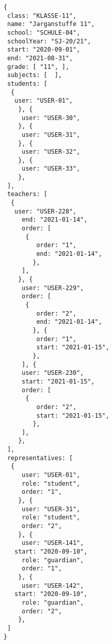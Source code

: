 
\begin{lstlisting}[caption={Klassen-Datenmodell Beispiel 2: Jahrgangstufe 11, Sekundarstufe 2},frame=tlrb]
{
 class: "KLASSE-11",
 name: "Jarganstuffe 11",
 school: "SCHULE-04",
 schoolYear: "SJ-20/21",
 start: "2020-09-01",
 end: "2021-08-31",
 grade: [ "11", ],
 subjects: [  ],
 students: [
  { 
   user: "USER-01",
	}, { 
	 user: "USER-30",
	}, { 
	 user: "USER-31",
	}, { 
	 user: "USER-32",
	}, { 
	 user: "USER-33",
	},
 ],
 teachers: [
  { 
   user: "USER-228",
	 end: "2021-01-14",
	 order: [
	  {
		 order: "1",
		 end: "2021-01-14",
		},
	 ],
	}, { 
	 user: "USER-229",
	 order: [
	  {
		 order: "2",
		 end: "2021-01-14",
		}, {
		 order: "1",
		 start: "2021-01-15",
		},
	 ], { 
	 user: "USER-230",
	 start: "2021-01-15",
	 order: [
	  {
		 order: "2",
		 start: "2021-01-15",
		},
	 ],
	},
 ],
 representatives: [
  {
	 user: "USER-01",
	 role: "student",
	 order: "1",	 
	}, {
	 user: "USER-31",
	 role: "student",
	 order: "2",	 
	}, {
	 user: "USER-141",
   start: "2020-09-10",
	 role: "guardian",
	 order: "1",	 
	}, {
	 user: "USER-142",
   start: "2020-09-10",
	 role: "guardian",
	 order: "2",	 
	},  
 ]
}
\end{lstlisting}
